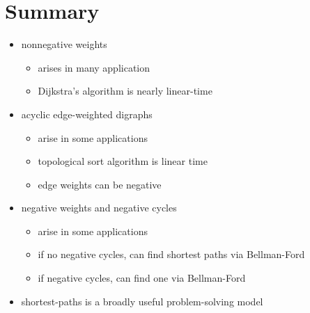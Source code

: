 \documentclass[8pt,a4paper,compress]{beamer}
\begin{document}
\section{Summary}
\begin{frame}[fragile]
\begin{itemize}
\item nonnegative weights
\begin{itemize}
\item arises in many application
\item Dijkstra's algorithm is nearly linear-time
\end{itemize}

\item acyclic edge-weighted digraphs
\begin{itemize}
\item arise in some applications
\item topological sort algorithm is linear time
\item edge weights can be negative
\end{itemize}

\item negative weights and negative cycles
\begin{itemize}
\item arise in some applications
\item if no negative cycles, can find shortest paths via Bellman-Ford
\item if negative cycles, can find one via Bellman-Ford
\end{itemize}

\item shortest-paths is a broadly useful problem-solving model
\end{itemize}
\end{frame}
\end{document}
